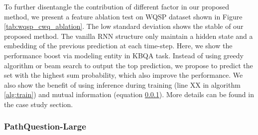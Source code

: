 To further disentangle the contribution of different factor in our proposed method, we present a feature ablation test on WQSP dataset shown in Figure \ref{tab:wqsp_cwq_ablation}. The low standard deviation shows the stable of our proposed method. The vanilla RNN structure only maintain a hidden state and a embedding of the previous prediction at each time-step. Here, we show the performance boost via modeling entity in KBQA task. Instead of using greedy algorithm or beam search to output the top prediction, we propose to predict the set with the highest sum probability, which also improve the performance. We also show the benefit of using inference during training (line XX in algorithm \ref{alg:train}) and mutual information (equation \ref{}). More details can be found in the case study section. 

\subsubsection{PathQuestion-Large}


\begin{table}[h]\centering
{}
\caption{\fontsize{10}{12}\selectfont We report set accuracy ($\%$) on PQL. For UHop, we use the best reported setup from the original paper, \emph{i.e.} ABWIM with UHop.}\label{tab:qpl}
\end{table}

